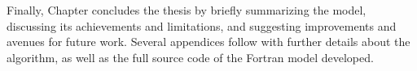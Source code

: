Finally, Chapter \Rom{\ref{chap:conclusion}} concludes the thesis by briefly summarizing the model, discussing its achievements and limitations, and suggesting improvements and avenues for future work.
Several appendices follow with further details about the algorithm, as well as the full source code of the Fortran model developed.
